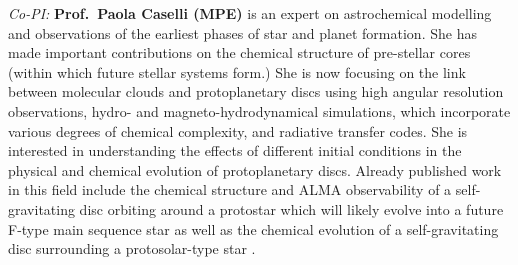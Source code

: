 \documentclass[10pt,fleqn,twoside]{article}
\begin{document}
{\it Co-PI:} {\bf Prof.\ Paola Caselli (MPE)} 
is an expert on astrochemical
modelling and observations of the earliest phases of star and planet
formation. She has made important contributions on the chemical structure
of pre-stellar cores (within which future stellar systems form.)
She is
now focusing on the link between molecular clouds and protoplanetary
discs using high angular resolution observations, hydro- and
magneto-hydrodynamical simulations, which incorporate various degrees
of chemical complexity, and radiative transfer codes. She is
interested in understanding the effects of different initial
conditions in the physical and chemical evolution of protoplanetary
discs. Already published work in this field include the chemical
structure and ALMA observability of a self-gravitating disc orbiting
around a protostar which will likely evolve into a future F-type main
sequence star \citep{2011MNRAS.417.2950I, 2013MNRAS.433.2064D}
as well as the
chemical evolution of a self-gravitating disc surrounding a
protosolar-type star \citep{2015MNRAS.453.1147E}. 
\end{document}
